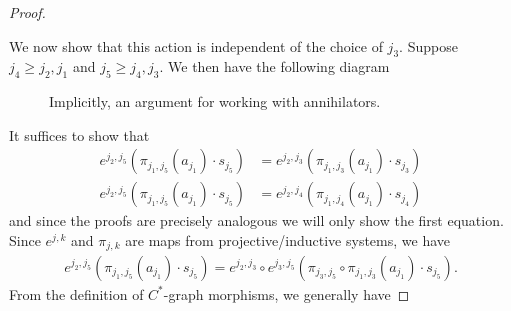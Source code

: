 \documentclass[12pt]{article}
\theoremstyle{definition}
\newcommand{\<}{\langle}
\renewcommand{\>}{\rangle}
\begin{document}
\begin{proof}
\begin{center}
    \end{center}    
    We now show that this action is independent of the choice of $j_3$. Suppose $j_4 \geq j_2, j_1$ and $j_5 \geq j_4, j_3$. We then have the following diagram
    \begin{figure}[H]
    \centering
        \caption{Implicitly, an argument for working with annihilators.}
    \end{figure}
It suffices to show that
    \begin{align*}
        e^{j_2,j_5}(\pi_{j_1, j_5}(a_{j_1}) \cdot s_{j_5}) &= e^{j_2,j_3}(\pi_{j_1, j_3}(a_{j_1}) \cdot s_{j_3}) \\
        e^{j_2,j_5}(\pi_{j_1, j_5}(a_{j_1}) \cdot s_{j_5}) &= e^{j_2,j_4}(\pi_{j_1, j_4}(a_{j_1}) \cdot s_{j_4}) 
    \end{align*}
    and since the proofs are precisely analogous we will only show the first equation. Since $e^{j,k}$ and $\pi_{j,k}$ are maps from projective/inductive systems, we have 
    \begin{align} \label{eqn: c*graphlim}
    e^{j_2,j_5}(\pi_{j_1, j_5}(a_{j_1}) \cdot s_{j_5}) = e^{j_2,j_3} \circ e^{j_3, j_5} (\pi_{j_3, j_5} \circ \pi_{j_1, j_3} (a_{j_1}) \cdot s_{j_5}).
    \end{align}
    From the definition of $C^*$-graph morphisms, we generally have

\end{proof}
\end{document}
